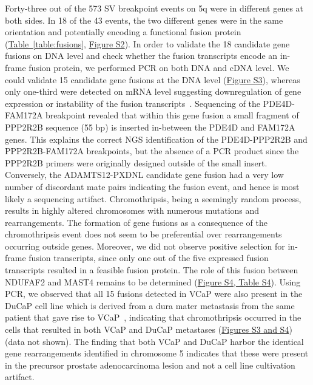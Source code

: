 Forty-three out of the 573 SV breakpoint events on 5q were in different genes at both sides. In 18 of the 43 events, the two different
genes were in the same orientation and potentially encoding a functional fusion protein (\hyperref[table:fusions]{Table~\ref*{table:fusions}}, \href{https://link.springer.com/article/10.1007/s00439-013-1308-1#SupplementaryMaterial}{Figure S2}). In order to validate
the 18 candidate gene fusions on DNA level and check whether the fusion transcripts encode an in-frame fusion protein, we performed
PCR on both DNA and cDNA level. We could validate 15 candidate gene fusions at the DNA level (\href{https://link.springer.com/article/10.1007/s00439-013-1308-1#SupplementaryMaterial}{Figure S3}), whereas only one-third were
detected on mRNA level suggesting downregulation of gene expression or instability of the fusion transcripts~\cite{stephens2011massive}.
Sequencing of the PDE4D-FAM172A breakpoint revealed that within this gene fusion a small fragment of PPP2R2B sequence (55 bp) is inserted
in-between the PDE4D and FAM172A genes. This explains the correct NGS identification of the PDE4D-PPP2R2B and PPP2R2B-FAM172A breakpoints,
 but the absence of a PCR product since the PPP2R2B primers were originally designed outside of the small insert. Conversely, the ADAMTS12-PXDNL
candidate gene fusion had a very low number of discordant mate pairs indicating the fusion event, and hence is most likely a sequencing artifact.
Chromothripsis, being a seemingly random process, results in highly altered chromosomes with numerous mutations and rearrangements. The formation
of gene fusions as a consequence of the chromothripsis event does not seem to be preferential over rearrangements occurring outside genes.
Moreover, we did not observe positive selection for in-frame fusion transcripts, since only one out of the five expressed fusion transcripts
resulted in a feasible fusion protein. The role of this fusion between NDUFAF2 and MAST4 remains to be determined (\href{https://link.springer.com/article/10.1007/s00439-013-1308-1#SupplementaryMaterial}{Figure S4, Table S4}). Using PCR,
we observed that all 15 fusions detected in VCaP were also present in the DuCaP cell line which is derived from a dura mater metastasis from the
same patient that gave rise to VCaP~\cite{lee2001establishment}, indicating that chromothripsis occurred in the cells that resulted in both VCaP and DuCaP
metastases (\href{https://link.springer.com/article/10.1007/s00439-013-1308-1#SupplementaryMaterial}{Figures S3 and S4}) (data not shown). The finding that both VCaP and DuCaP harbor the identical gene rearrangements identified in
chromosome 5 indicates that these were present in the precursor prostate adenocarcinoma lesion and not a cell line cultivation artifact.


